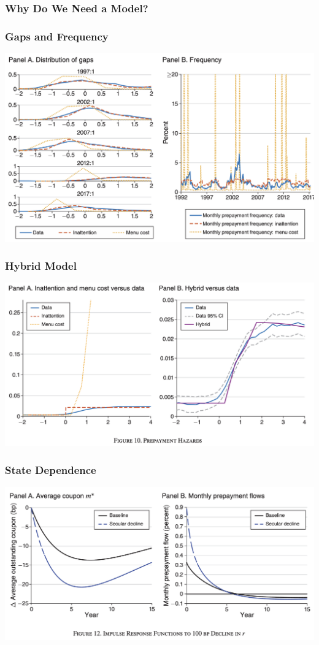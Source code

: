 \documentclass[english,xcolor=svgnames]{beamer}
\begin{document}
\begin{frame}
    \frametitle{Why Do We Need a Model?}
\end{frame}

\begin{frame}
    \frametitle{Gaps and Frequency}
    \begin{center}
    	\includegraphics[scale=0.3]{figures/BMTVFIG9AB.png}	
    \end{center}
\end{frame}

\begin{frame}
    \frametitle{Hybrid Model}
    \begin{center}
    	\includegraphics[scale=0.3]{figures/BMTVFIG10.png}	
    \end{center}
\end{frame}


\begin{frame}
    \frametitle{State Dependence}
    \begin{center}
    	\includegraphics[scale=0.3]{figures/BMTVFIG12.png}	
    \end{center}
\end{frame}
\end{document}
